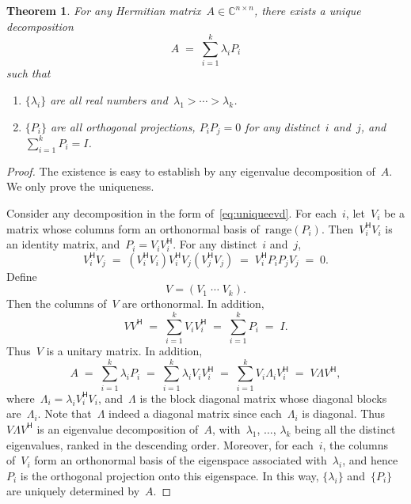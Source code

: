 \documentclass[11pt,a4paper]{article}
\newtheorem{theorem}{Theorem}%
\theoremstyle{definition}
\def\CC{\mathbb{C}}
\newcommand{\hmt}{{\scriptscriptstyle{{\mathsf{H}}}}}
\newcommand{\range}{\mathrm{range}}
\begin{document}
\begin{theorem}
  \label{th:uniqueevd}
  For any Hermitian matrix~$A \in\CC^{n\times n}$, there exists a unique decomposition
  \begin{equation}
    \label{eq:uniqueevd}
    A \;=\; \sum_{i=1}^k \lambda_i P_i
  \end{equation}
  such that
  \begin{enumerate}
    \item $\{\lambda_i\}$ are all real numbers and~$\lambda_1 > \cdots
      > \lambda_k$. 
    \item $\{P_i\}$ are all orthogonal projections, $P_iP_j = 0$ for any distinct~$i$ and~$j$,
      and~$\sum_{i=1}^k P_i = I$. 
  \end{enumerate}
\end{theorem}

\begin{proof}
  The existence is easy to establish by any eigenvalue decomposition of~$A$. We only prove the uniqueness. 

  Consider any decomposition in the form of~\eqref{eq:uniqueevd}. 
  For each~$i$, let~$V_i$ be a matrix whose columns form an orthonormal basis
  of~$\range(P_i)$. Then~$V_i^\hmt V_i$ is an identity matrix, and~$P_i = V_iV_i^\hmt$. For any
  distinct~$i$ and~$j$, 
  \begin{equation*}
    V_i^\hmt V_j \;=\;(V_i^\hmt V_i) V_i^\hmt V_j(V_j^\hmt V_j) \;=\; V_i^\hmt P_iP_j V_j\;=\; 0.
  \end{equation*}
  Define
  \begin{equation*}
    V = (V_1\; \cdots \; V_k).
  \end{equation*}
  Then the columns of~$V$ are orthonormal. In addition,
  \begin{equation*}
    VV^\hmt \;=\; \sum_{i=1}^k V_iV_i^\hmt \;=\; \sum_{i=1}^k P_i \;=\; I.
  \end{equation*}
  Thus~$V$ is a unitary matrix. In addition,
  \begin{equation*}
    A \;=\; \sum_{i=1}^k \lambda_i P_i \;=\; \sum_{i=1}^k\lambda_iV_iV_i^\hmt \;=\; \sum_{i=1}^k V_i\Lambda_iV_i^\hmt \;=\; V\Lambda V^\hmt,
  \end{equation*}
  where~$\Lambda_i = \lambda_i V_i^\hmt V_i$, and~$\Lambda$ is the block diagonal matrix whose
  diagonal blocks are~$\Lambda_i$. Note that~$\Lambda$ indeed a diagonal matrix since
  each~$\Lambda_i$ is diagonal. Thus~$V\Lambda V^\hmt$ is an eigenvalue decomposition of~$A$,
  with~$\lambda_1$, $\dots$, $\lambda_k$ being all the distinct eigenvalues, ranked in the descending
  order. Moreover, for
  each~$i$, the columns
  of~$V_i$ form an orthonormal basis of the eigenspace associated with~$\lambda_i$, and
  hence~$P_i$ is the orthogonal projection onto this eigenspace. In this way, $\{\lambda_i\}$
  and~$\{P_i\}$ are uniquely determined by~$A$.
\end{proof}
\end{document}
